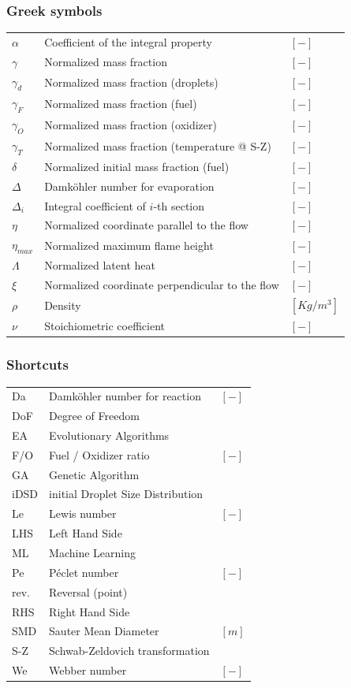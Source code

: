 \documentclass[12pt]{article}
\numberwithin{equation}{section}
\begin{document}
\begin{flushleft}
\subsubsection*{Greek symbols}
\begin{tabular}{ p{1.5cm} p{10cm} p{3cm} }
$\alpha$ & Coefficient of the integral property & $[-]$ \\
$\gamma$ & Normalized mass fraction & $[-]$ \\
$\gamma_d$ & Normalized mass fraction (droplets) & $[-]$ \\
$\gamma_F$ & Normalized mass fraction (fuel) & $[-]$ \\
$\gamma_O$ & Normalized mass fraction (oxidizer) & $[-]$ \\
$\gamma_T$ & Normalized mass fraction (temperature @ S-Z) & $[-]$ \\
$\delta$ & Normalized initial mass fraction (fuel) & $[-]$ \\
$\Delta$ & Damköhler number for evaporation & $[-]$ \\
$\Delta_i$ & Integral coefficient of $i$-th section & $[-]$ \\
$\eta$ & Normalized coordinate parallel to the flow & $[-]$ \\
$\eta_{max}$ & Normalized maximum flame height & $[-]$ \\
$\Lambda$ & Normalized latent heat & $[-]$ \\
$\xi$ & Normalized coordinate perpendicular to the flow & $[-]$ \\
$\rho$ & Density & $[Kg / m^3]$ \\
$\nu$ & Stoichiometric coefficient & $[-]$ \\
\end{tabular}

\subsubsection*{Shortcuts}
\begin{tabular}{ p{1.5cm} p{10cm} p{3cm} }
Da & Damköhler number for reaction & $[-]$ \\
DoF & Degree of Freedom &  \\ 
EA & Evolutionary Algorithms &  \\
F/O & Fuel / Oxidizer ratio & $[-]$ \\
GA & Genetic Algorithm &  \\
iDSD & initial Droplet Size Distribution &  \\
Le & Lewis number & $[-]$ \\
LHS & Left Hand Side &  \\
ML & Machine Learning &  \\
Pe & Péclet number & $[-]$ \\
rev. & Reversal (point) &  \\
RHS & Right Hand Side &  \\
SMD & Sauter Mean Diameter & $[m]$ \\
S-Z & Schwab-Zeldovich transformation & \\
We & Webber number & $[-]$ \\
\end{tabular}
\newpage



\end{flushleft}
\end{document}
